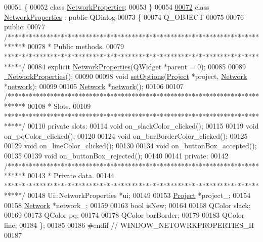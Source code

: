 \begin{DoxyCode}
00051 \{
00052 \textcolor{keyword}{class }\hyperlink{class_network_properties}{NetworkProperties};
00053 \}
00054 
\hypertarget{networkproperties_8h_source_l00072}{}\hyperlink{class_network_properties}{00072} \textcolor{keyword}{class }\hyperlink{class_network_properties}{NetworkProperties} : \textcolor{keyword}{public} QDialog
00073 \{
00074   Q\_OBJECT
00075 
00076 \textcolor{keyword}{public}:
00077   \textcolor{comment}{/*****************************************************************************}
00078 \textcolor{comment}{  * Public methods.}
00079 \textcolor{comment}{  *****************************************************************************/}
00084   \textcolor{keyword}{explicit} \hyperlink{group___window_ga3d9dac6454f6e722360d9d77af85e4ce}{NetworkProperties}(QWidget *parent = 0);
00085 
00089   \hyperlink{group___window_ga097b617788eebe80236c0041f8293422}{~NetworkProperties}();
00090 
00098   \textcolor{keywordtype}{void} \hyperlink{group___window_ga9dd17216f65e1c35012699e13547d984}{setOptions}(\hyperlink{class_project}{Project} *project, \hyperlink{class_network}{Network} *\hyperlink{group___window_gac166b4624361fe4f3003bbe5553ad18b}{network});
00099 
00105   \hyperlink{class_network}{Network} *\hyperlink{group___window_gac166b4624361fe4f3003bbe5553ad18b}{network}();
00106 
00107   \textcolor{comment}{/*****************************************************************************}
00108 \textcolor{comment}{  * Slots.}
00109 \textcolor{comment}{  *****************************************************************************/}
00110 \textcolor{keyword}{private} slots:
00114   \textcolor{keywordtype}{void} on\_slackColor\_clicked();
00115 
00119   \textcolor{keywordtype}{void} on\_pqColor\_clicked();
00120 
00124   \textcolor{keywordtype}{void} on\_barBorderColor\_clicked();
00125 
00129   \textcolor{keywordtype}{void} on\_lineColor\_clicked();
00130 
00134   \textcolor{keywordtype}{void} on\_buttonBox\_accepted();
00135 
00139   \textcolor{keywordtype}{void} on\_buttonBox\_rejected();
00140 
00141 \textcolor{keyword}{private}:
00142   \textcolor{comment}{/*****************************************************************************}
00143 \textcolor{comment}{  * Private data.}
00144 \textcolor{comment}{  *****************************************************************************/}
00148   Ui::NetworkProperties *ui;
00149 
00153   \hyperlink{class_project}{Project} *project\_;
00154 
00158   \hyperlink{class_network}{Network} *network\_;
00159 
00163   \textcolor{keywordtype}{bool} isNew;
00164 
00168   QColor slack;
00169 
00173   QColor pq;
00174 
00178   QColor barBorder;
00179 
00183   QColor line;
00184 \};
00185 
00186 \textcolor{preprocessor}{#endif // WINDOW\_NETOWRKPROPERTIES\_H}
00187 
\end{DoxyCode}
